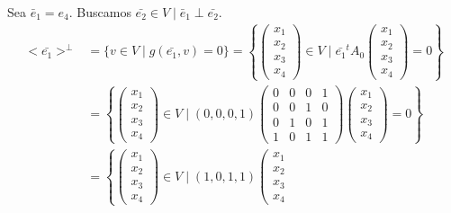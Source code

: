 \begin{ejercicio}
\begin{enumerate}
\begin{itemize}
            
            Sea $\bar{e}_1 = e_4$. Buscamos $\bar{e_2}\in V \mid \bar{e}_1\perp \bar{e_2}$.
            \begin{equation*}\begin{split}
                <\bar{e_1}>^\perp &= \{v \in V \mid g(\bar{e_1},v) = 0\} = \left\{ \left(\begin{array}{c}
                     x_1 \\ x_2 \\ x_3 \\ x_4
                \end{array} \right) \in V \mid \bar{e_1}^t A_0
                \left(\begin{array}{c}
                     x_1 \\ x_2 \\ x_3 \\x_4
                \end{array} \right) = 0\right\} \\
                &= \left\{ \left(\begin{array}{c}
                     x_1 \\ x_2 \\ x_3 \\ x_4
                \end{array} \right) \in V \mid (0, 0, 0, 1) \left(\begin{array}{cccc}
                    0 & 0 & 0 & 1 \\
                    0 & 0 & 1 & 0 \\
                    0 & 1 & 0 & 1 \\
                    1 & 0 & 1 & 1
                \end{array} \right) 
                \left(\begin{array}{c}
                     x_1 \\ x_2 \\ x_3 \\x_4
                \end{array} \right) = 0\right\} \\
                &= \left\{ \left(\begin{array}{c}
                     x_1 \\ x_2 \\ x_3 \\x_4
                \end{array} \right) \in V \mid (1, 0, 1, 1)
                \left(\begin{array}{c}
                     x_1 \\ x_2 \\ x_3 \\ x_4

\end{array}
\end{split}
\end{equation*}
\end{itemize}
\end{enumerate}
\end{ejercicio}
